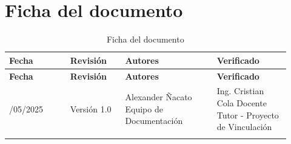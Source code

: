 \documentclass[12pt, a4paper]{article}
\begin{document}
\newpage
\thispagestyle{fancy}
\section*{Ficha del documento}

\begin{longtable}{p{0.20\linewidth} p{0.18\linewidth} p{0.30\linewidth} p{0.24\linewidth}}
\toprule
\rowcolor{tableheader!20}
\textbf{Fecha} & \textbf{Revisión} & \textbf{Autores} & \textbf{Verificado} \\
\midrule
\endfirsthead
\rowcolor{tableheader!20}
\textbf{Fecha} & \textbf{Revisión} & \textbf{Autores} & \textbf{Verificado} \\
\midrule
\endhead
\bottomrule
\endfoot
15/05/2025 & Versión 1.0 &
Alexander Ñacato \newline Equipo de Documentación &
Ing. Cristian Cola \newline Docente Tutor - Proyecto de Vinculación \\
\bottomrule
\caption{Ficha del documento}
\label{tab:ficha_documento}
\end{longtable}
\newpage
\thispagestyle{fancy}
{\hypersetup{linkcolor=darkgray}
\tableofcontents}

\newpage


\newpage


\newpage


\newpage


\newpage

\end{document}
